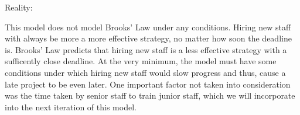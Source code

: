 \documentclass{article}
\newenvironment{atomize}
    {\begin{list} {} {
            \setlength\itemindent{0pt}
            \setlength\leftmargin{10pt}
            \setlength\labelwidth{0pt}
    }}
    {\end{list}}
\begin{document}
\begin{atomize}
		\item Reality:
			\begin{atomize}
				\item This model does not model Brooks' Law under any conditions.
				Hiring new staff with always be more a more effective strategy, no
				matter how soon the deadline is. Brooks' Law predicts that hiring
				new staff is a less effective strategy with a sufficently close
				deadline.  At the very minimum, the model must have some conditions
				under which hiring new staff would slow progress and thus, cause a
				late project to be even later. One important factor not taken into
				consideration was the time taken by senior staff to train junior
				staff, which we will incorporate into the next iteration of this
				model.
			\end{atomize}
  \end{atomize}
\end{document}
